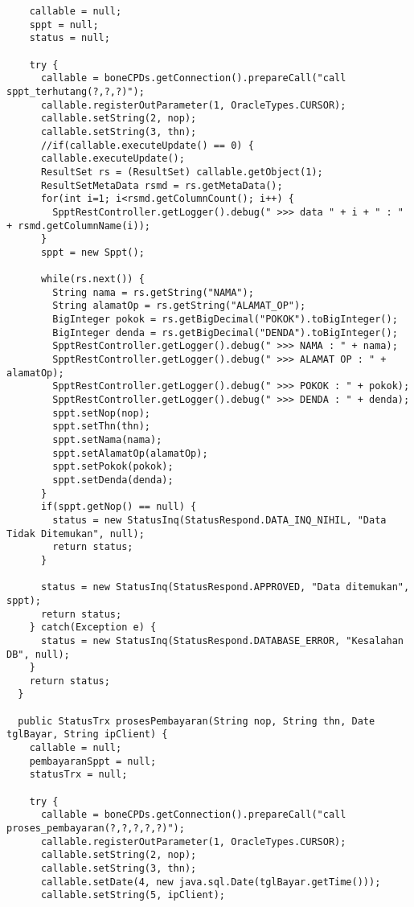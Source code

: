 \documentclass[pdftex,12pt, oneside]{article}
\begin{document}
\begin{lstlisting}
    callable = null;
    sppt = null;
    status = null;

    try {
      callable = boneCPDs.getConnection().prepareCall("call sppt_terhutang(?,?,?)");
      callable.registerOutParameter(1, OracleTypes.CURSOR);
      callable.setString(2, nop);
      callable.setString(3, thn);
      //if(callable.executeUpdate() == 0) {
      callable.executeUpdate();
      ResultSet rs = (ResultSet) callable.getObject(1);
      ResultSetMetaData rsmd = rs.getMetaData();
      for(int i=1; i<rsmd.getColumnCount(); i++) {
        SpptRestController.getLogger().debug(" >>> data " + i + " : " + rsmd.getColumnName(i));
      }
      sppt = new Sppt();

      while(rs.next()) {
        String nama = rs.getString("NAMA");
        String alamatOp = rs.getString("ALAMAT_OP");
        BigInteger pokok = rs.getBigDecimal("POKOK").toBigInteger();
        BigInteger denda = rs.getBigDecimal("DENDA").toBigInteger();
        SpptRestController.getLogger().debug(" >>> NAMA : " + nama);
        SpptRestController.getLogger().debug(" >>> ALAMAT OP : " + alamatOp);
        SpptRestController.getLogger().debug(" >>> POKOK : " + pokok);
        SpptRestController.getLogger().debug(" >>> DENDA : " + denda);
        sppt.setNop(nop);
        sppt.setThn(thn);
        sppt.setNama(nama);
        sppt.setAlamatOp(alamatOp);
        sppt.setPokok(pokok);
        sppt.setDenda(denda);
      }
      if(sppt.getNop() == null) {
        status = new StatusInq(StatusRespond.DATA_INQ_NIHIL, "Data Tidak Ditemukan", null);
        return status;
      }

      status = new StatusInq(StatusRespond.APPROVED, "Data ditemukan", sppt);
      return status;
    } catch(Exception e) {
      status = new StatusInq(StatusRespond.DATABASE_ERROR, "Kesalahan DB", null);
    }
    return status;
  }

  public StatusTrx prosesPembayaran(String nop, String thn, Date tglBayar, String ipClient) {
    callable = null;
    pembayaranSppt = null;
    statusTrx = null;

    try {
      callable = boneCPDs.getConnection().prepareCall("call proses_pembayaran(?,?,?,?,?)");
      callable.registerOutParameter(1, OracleTypes.CURSOR);
      callable.setString(2, nop);
      callable.setString(3, thn);
      callable.setDate(4, new java.sql.Date(tglBayar.getTime()));
      callable.setString(5, ipClient);


\end{lstlisting}
\end{document}
